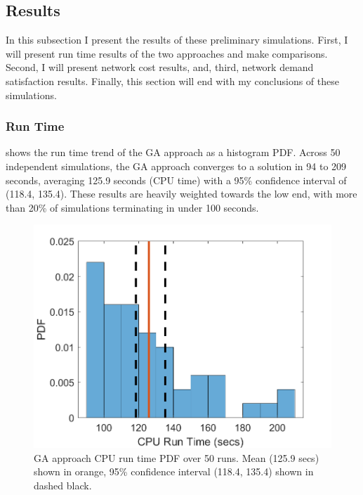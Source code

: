\documentclass[12pt,dvipsnames]{report}
\begin{document}
\subsection{Results} \label{subsec:prelim_results}

In this subsection I present the results of these preliminary simulations.  First, I will present run time results of the two approaches and make comparisons.  Second, I will present network cost results, and, third, network demand satisfaction results.  Finally, this section will end with my conclusions of these simulations.

\subsubsection{Run Time}

 shows the run time trend of the GA approach as a histogram PDF.  Across 50 independent simulations, the GA approach converges to a solution in 94 to 209 seconds, averaging 125.9 seconds (CPU time) with a 95\% confidence interval of (118.4, 135.4).  These results are heavily weighted towards the low end, with more than 20\% of simulations terminating in under 100 seconds.

\begin{figure}[tp]
	\centering
	\includegraphics[height=0.4\textheight]{Figures/Prelim_GARuntime50}
	\caption[Preliminary simulations GA CPU run time PDF]{GA approach CPU run time PDF over 50 runs.  Mean (125.9 secs) shown in orange, 95\% confidence interval (118.4, 135.4) shown in dashed black.}
	\label{fig:Prelim_GARunTime}
\end{figure}
\end{document}
